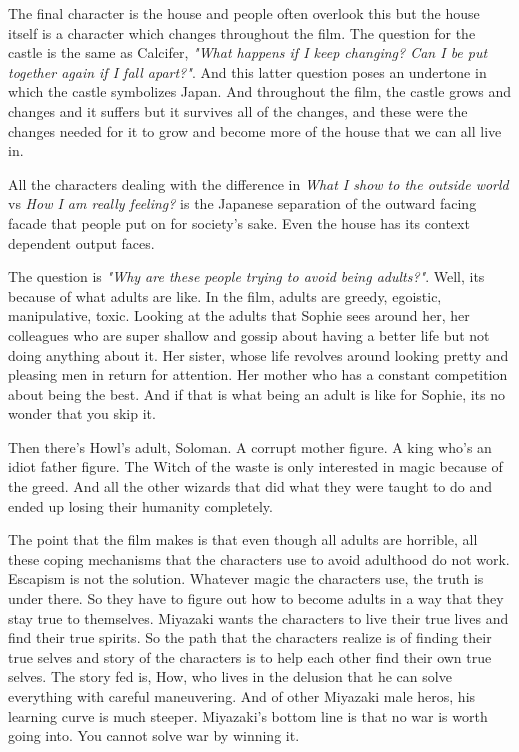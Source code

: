 \documentclass[11pt, letterpaper]{article}
\begin{document}
The final character is the house and people often overlook this but the house itself is a character which changes throughout the film. The question for the castle is the same as Calcifer, \textit{"What happens if I keep changing? Can I be put together again if I fall apart?"}. And this latter question poses an undertone in which the castle symbolizes Japan. And throughout the film, the castle grows and changes and it suffers but it survives all of the changes, and these were the changes needed for it to grow and become more of the house that we can all live in. 

All the characters dealing with the difference in \textit{What I show to the outside world} vs \textit{How I am really feeling?} is the Japanese separation of the outward facing facade that people put on for society's sake. Even the house has its context dependent output faces. 

The question is \textit{"Why are these people trying to avoid being adults?"}. Well, its because of what adults are like. In the film, adults are greedy, egoistic, manipulative, toxic. Looking at the adults that Sophie sees around her, her colleagues who are super shallow and gossip about having a better life but not doing anything about it. Her sister, whose life revolves around looking pretty and pleasing men in return for attention. Her mother who has a constant competition about being the best. And if that is what being an adult is like for Sophie, its no wonder that you skip it. 

Then there's Howl's adult, Soloman. A corrupt mother figure. A king who's an idiot father figure. The Witch of the waste is only interested in magic because of the greed. And all the other wizards that did what they were taught to do and ended up losing their humanity completely. 

The point that the film makes is that even though all adults are horrible, all these coping mechanisms that the characters use to avoid adulthood do not work. Escapism is not the solution. Whatever magic the characters use, the truth is under there. So they have to figure out how to become adults in a way that they stay true to themselves. Miyazaki wants the characters to live their true lives and find their true spirits. So the path that the characters realize is of finding their true selves and story of the characters is to help each other find their own true selves. The story fed is, How, who lives in the delusion that he can solve everything with careful maneuvering. And of other Miyazaki male heros, his learning curve is much steeper. Miyazaki's bottom line is that no war is worth going into. You cannot solve war by winning it. 
\end{document}
